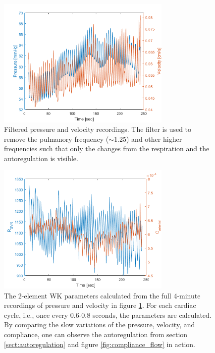 \newpage


\newpage

\begin{figure}[b!]
    \centering
    \includegraphics[width=0.75\textwidth]{fig/methods/measurements_patient18.png}
    \caption{Filtered pressure and velocity recordings. The filter is used to remove the pulmanory frequency ($\sim$1.25) and other higher frequencies such that only the changes from the respiration and the autoregulation is visible.}
    \label{fig:measurements_patient18}
\end{figure}{}

\begin{figure}[b!]
    \centering
    \includegraphics[width=0.75\textwidth]{fig/methods/parameters_patient18.png}
    \caption{The 2-element WK parameters calculated from the full 4-minute recordings of pressure and velocity in figure \ref{fig:measurements_patient18}. For each cardiac cycle, i.e., once every 0.6-0.8 seconds, the parameters are calculated. By comparing the slow variations of the pressure, velocity, and compliance, one can observe the autoregulation from section \ref{sect:autoregulation} and figure \ref{fig:compliance_flow} in action.}
    \label{fig:parameters_patient18}
\end{figure}{}

